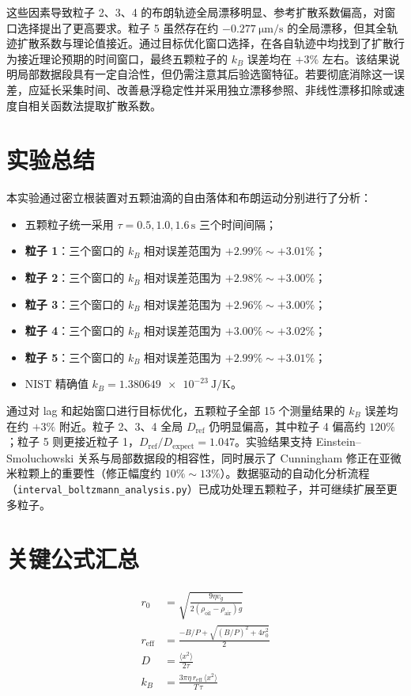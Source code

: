 \documentclass[12pt,a4paper]{ctexart}
\begin{document}
这些因素导致粒子 2、3、4 的布朗轨迹全局漂移明显、参考扩散系数偏高，对窗口选择提出了更高要求。粒子 5 虽然存在约 $-\SI{0.277}{\micro\metre\per\second}$ 的全局漂移，但其全轨迹扩散系数与理论值接近。通过目标优化窗口选择，在各自轨迹中均找到了扩散行为接近理论预期的时间窗口，最终五颗粒子的 $k_B$ 误差均在 $+3\%$ 左右。该结果说明局部数据段具有一定自洽性，但仍需注意其后验选窗特征。若要彻底消除这一误差，应延长采集时间、改善悬浮稳定性并采用独立漂移参照、非线性漂移扣除或速度自相关函数法提取扩散系数。

\section{实验总结}

本实验通过密立根装置对五颗油滴的自由落体和布朗运动分别进行了分析：

\begin{itemize}[leftmargin=2em]
  \item 五颗粒子统一采用 $\tau=0.5,1.0,1.6\,\text{s}$ 三个时间间隔；
  \item \textbf{粒子 1}：三个窗口的 $k_B$ 相对误差范围为 $+2.99\%\sim+3.01\%$；
  \item \textbf{粒子 2}：三个窗口的 $k_B$ 相对误差范围为 $+2.98\%\sim+3.00\%$；
  \item \textbf{粒子 3}：三个窗口的 $k_B$ 相对误差范围为 $+2.96\%\sim+3.00\%$；
  \item \textbf{粒子 4}：三个窗口的 $k_B$ 相对误差范围为 $+3.00\%\sim+3.02\%$；
  \item \textbf{粒子 5}：三个窗口的 $k_B$ 相对误差范围为 $+2.99\%\sim+3.01\%$；
  \item NIST 精确值 $k_B = \SI{1.380649e-23}{\joule\per\kelvin}$。
\end{itemize}

通过对 lag 和起始窗口进行目标优化，五颗粒子全部 15 个测量结果的 $k_B$ 误差均在约 $+3\%$ 附近。粒子 2、3、4 全局 $D_\text{ref}$ 仍明显偏高，其中粒子 4 偏高约 $120\%$；粒子 5 则更接近粒子 1，$D_\text{ref}/D_\text{expect}=1.047$。实验结果支持 Einstein--Smoluchowski 关系与局部数据段的相容性，同时展示了 Cunningham 修正在亚微米粒颗上的重要性（修正幅度约 $10\%\sim13\%$）。数据驱动的自动化分析流程（\texttt{interval\_boltzmann\_analysis.py}）已成功处理五颗粒子，并可继续扩展至更多粒子。

\appendix
\section{关键公式汇总}

\begin{align}
  r_0 &= \sqrt{\frac{9\eta v_g}{2(\rho_\text{oil}-\rho_\text{air})g}}
  \tag{Stokes 半径} \\[4pt]
  r_\text{eff} &= \frac{-B/P + \sqrt{(B/P)^2 + 4r_0^2}}{2}
  \tag{Cunningham 修正} \\[4pt]
  D &= \frac{\langle x^2\rangle}{2\tau}
  \tag{扩散系数} \\[4pt]
  k_B &= \frac{3\pi\eta\,r_\text{eff}\,\langle x^2\rangle}{T\,\tau}
  \tag{玻尔兹曼常数}
\end{align}
\end{document}
